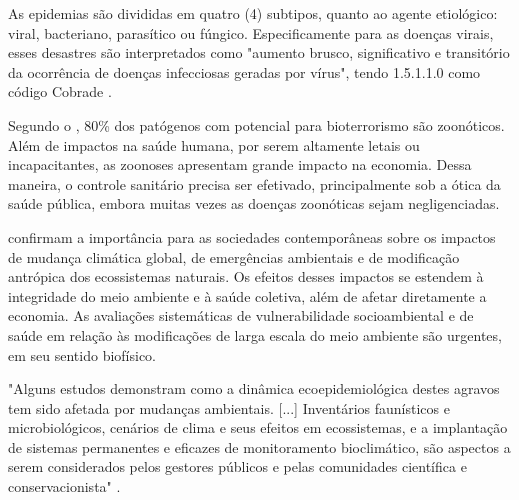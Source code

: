 \indent As epidemias são divididas em quatro (4) subtipos,  quanto ao agente etiológico: viral, bacteriano, parasítico ou fúngico. Especificamente para as doenças virais, esses desastres são interpretados como "aumento brusco, significativo e transitório da ocorrência de doenças infecciosas geradas por vírus", tendo 1.5.1.1.0 como código \acrshort{Cobrade} \cite{GIRD}.

\indent Segundo o , 80\% dos patógenos com potencial para bioterrorismo são zoonóticos. Além de impactos na saúde humana, por serem altamente letais ou incapacitantes, as zoonoses apresentam grande impacto na economia. Dessa maneira, o controle sanitário precisa ser efetivado, principalmente sob a ótica da saúde pública, embora muitas vezes as doenças zoonóticas sejam negligenciadas.

\indent {} confirmam a importância para as sociedades contemporâneas sobre os impactos de mudança climática global, de emergências ambientais e de modificação antrópica dos ecossistemas naturais. Os efeitos desses impactos se estendem à integridade do meio ambiente e à saúde coletiva, além de afetar diretamente a economia. As avaliações sistemáticas de vulnerabilidade socioambiental e de saúde em relação às modificações de larga escala do meio ambiente são urgentes, em seu sentido biofísico. 

\begin{citacao}
"Alguns estudos demonstram como a dinâmica ecoepidemiológica destes agravos tem sido afetada por mudanças ambientais. [...] Inventários faunísticos e microbiológicos, cenários de clima e seus efeitos em ecossistemas, e a implantação de sistemas permanentes e eficazes de monitoramento bioclimático, são aspectos a serem considerados pelos gestores públicos e pelas comunidades científica e conservacionista" \cite[pg-2325]{Cubas2014Tratado}.
\end{citacao}


